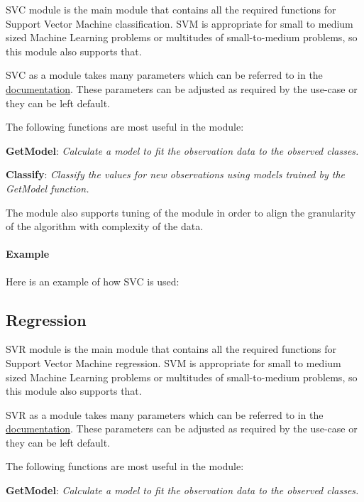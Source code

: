 SVC module is the main module that contains all the required functions for Support Vector Machine classification. SVM is appropriate for small to medium sized Machine Learning problems or multitudes of small-to-medium problems, so this module also supports that. 

SVC as a module takes many parameters which can be referred to in the \href{https://cdn.hpccsystems.com/pdf/ml/SupportVectorMachines.pdf}{documentation}. These parameters can be adjusted as required by the use-case or they can be left default. 

The following functions are most useful in the module:

\textbf{GetModel}: \textit{Calculate a model to fit the observation data to the observed classes.}

\textbf{Classify}: \textit{Classify the values for new observations using models trained by the GetModel function.}

The module also supports tuning of the module in order to align the granularity of the algorithm with complexity of the data.

\paragraph{Example}

Here is an example of how SVC is used:



\pagebreak

\subsection{Regression}

SVR module is the main module that contains all the required functions for Support Vector Machine regression. SVM is appropriate for small to medium sized Machine Learning problems or multitudes of small-to-medium problems, so this module also supports that. 

SVR as a module takes many parameters which can be referred to in the \href{https://cdn.hpccsystems.com/pdf/ml/SupportVectorMachines.pdf}{documentation}. These parameters can be adjusted as required by the use-case or they can be left default. 

The following functions are most useful in the module:

\textbf{GetModel}: \textit{Calculate a model to fit the observation data to the observed classes.}

